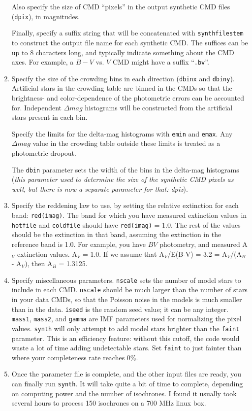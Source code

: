 \documentclass[12pt]{book}
\def\ttg{\tt\color{DarkGreen}}
\def\tto{\tt\color{myOrange}}
\def\itr{\it\color{myRed}}
\begin{document}
\begin{enumerate}
Also specify the size of CMD ``pixels'' in the output synthetic CMD 
files ({\tto dpix}), in magnitudes.

Finally, specify a suffix string that will be concatenated with 
{\tto synthfilestem} to construct the output file name for each 
synthetic CMD.  The suffices can be up to 8 characters long, and 
typically indicate something about the CMD axes. For example, a
$B-V$ vs. $V$ CMD might have a suffix ``{\ttg .bv}''.

\item Specify the size of the crowding bins in each direction 
({\tto dbinx} and {\tto dbiny}).  Artificial stars in the crowding 
table are binned in the CMDs so that the brightness- and 
color-dependence of the photometric errors can be accounted for.
Independent $\Delta mag$ histograms will be constructed from the 
artificial stars present in each bin.  

Specify the limits for the delta-mag histograms with {\tto emin} and 
{\tto emax}.  Any $\Delta mag$ value in the crowding table outside 
these limits is treated as a photometric dropout.

The {\tto dbin} parameter sets the width of the bins in the delta-mag 
histograms ({\itr this parameter used to determine the size of the 
synthetic CMD pixels as well, but there is now a separate parameter 
for that: dpix}).

\item Specify the reddening law to use, by setting the relative 
extinction for each band: {\tto red(imag)}.  The band for which you 
have measured extinction values in {\tto hotfile} and {\tto coldfile} 
should have {\tto red(imag)} = 1.0.  The rest of the values should be 
the extinction in that band, assuming the extinction in the reference 
band is 1.0.  For example, you have $BV$ photometry, and measured 
A$_V$ extinction values.  A$_V$ = 1.0.  If we assume that 
A$_V$/E(B-V) = 3.2 = A$_V$/(A$_B$ - A$_V$), then A$_B$ = 1.3125. 

\item Specify miscellaneous parameters.  {\tto nscale} sets the number 
of model stars to include in each CMD.  {\tto nscale} should be much 
larger than the number of stars in your data CMDs, so that the Poisson 
noise in the models is much smaller than in the data.  {\tto iseed} is 
the random seed value; it can be any integer.  {\tto mass1}, 
{\tto mass2}, and {\tto gamma} are IMF parameters used for normalizing 
the pixel values.  {\ttg synth} will only attempt to add model stars 
brighter than the {\tto faint} parameter.  This is an efficiency 
feature: without this cutoff, the code would waste a lot of time 
adding undetectable stars.  Set {\tto faint} to just fainter than 
where your completeness rate reaches 0\%.

\item Once the parameter file is complete, and the other input files 
are ready, you can finally run {\ttg synth}.  It will take quite a bit 
of time to complete, depending on computing power and the number of 
isochrones.  I found it usually took several hours to process 150 
isochrones on a 700 MHz linux box.  
\end{enumerate}
\end{document}
